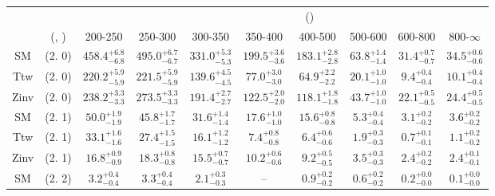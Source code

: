 \begin{table}[h!]
\tiny
\centering
{}
\begin{tabular}
{cccccccccc}
	\hline\hline
&	&	& \multicolumn{8}{c}{\scalht (\gev)}\\ 
	&	 (\njet, \nb) & 200-250 & 250-300 & 300-350 & 350-400 & 400-500 & 500-600 & 600-800 & 800-$\infty$ \\ [0.8ex] 
\hline
	SM & (2. 0) & $458.4^{+ 6.8 }_{- 6.8 }$ & $495.0^{+ 6.7 }_{- 6.7 }$ & $331.0^{+ 5.3 }_{- 5.3 }$ & $199.5^{+ 3.6 }_{- 3.6 }$ & $183.1^{+ 2.8 }_{- 2.8 }$ & $63.8^{+ 1.4 }_{- 1.4 }$ & $31.4^{+ 0.7 }_{- 0.7 }$ & $34.5^{+ 0.6 }_{- 0.6 }$ \\[0.5ex] 
	Ttw & (2. 0) & $220.2^{+ 5.9 }_{- 5.9 }$ & $221.5^{+ 5.9 }_{- 5.9 }$ & $139.6^{+ 4.5 }_{- 4.5 }$ & $77.0^{+ 3.0 }_{- 3.0 }$ & $64.9^{+ 2.2 }_{- 2.2 }$ & $20.1^{+ 1.0 }_{- 1.0 }$ & $9.4^{+ 0.4 }_{- 0.4 }$ & $10.1^{+ 0.4 }_{- 0.4 }$ \\[0.5ex] 
	Zinv & (2. 0) & $238.2^{+ 3.3 }_{- 3.3 }$ & $273.5^{+ 3.3 }_{- 3.3 }$ & $191.4^{+ 2.7 }_{- 2.7 }$ & $122.5^{+ 2.0 }_{- 2.0 }$ & $118.1^{+ 1.8 }_{- 1.8 }$ & $43.7^{+ 1.0 }_{- 1.0 }$ & $22.1^{+ 0.5 }_{- 0.5 }$ & $24.4^{+ 0.5 }_{- 0.5 }$ \\[0.5ex] 
	SM & (2. 1) & $50.0^{+ 1.9 }_{- 1.9 }$ & $45.8^{+ 1.7 }_{- 1.7 }$ & $31.6^{+ 1.4 }_{- 1.4 }$ & $17.6^{+ 1.0 }_{- 1.0 }$ & $15.6^{+ 0.8 }_{- 0.8 }$ & $5.3^{+ 0.4 }_{- 0.4 }$ & $3.1^{+ 0.2 }_{- 0.2 }$ & $3.6^{+ 0.2 }_{- 0.2 }$ \\[0.5ex] 
	Ttw & (2. 1) & $33.1^{+ 1.6 }_{- 1.6 }$ & $27.4^{+ 1.5 }_{- 1.5 }$ & $16.1^{+ 1.2 }_{- 1.2 }$ & $7.4^{+ 0.8 }_{- 0.8 }$ & $6.4^{+ 0.6 }_{- 0.6 }$ & $1.9^{+ 0.3 }_{- 0.3 }$ & $0.7^{+ 0.1 }_{- 0.1 }$ & $1.1^{+ 0.2 }_{- 0.2 }$ \\[0.5ex] 
	Zinv & (2. 1) & $16.8^{+ 0.9 }_{- 0.9 }$ & $18.3^{+ 0.8 }_{- 0.8 }$ & $15.5^{+ 0.7 }_{- 0.7 }$ & $10.2^{+ 0.6 }_{- 0.6 }$ & $9.2^{+ 0.5 }_{- 0.5 }$ & $3.5^{+ 0.3 }_{- 0.3 }$ & $2.4^{+ 0.2 }_{- 0.2 }$ & $2.4^{+ 0.1 }_{- 0.1 }$ \\[0.5ex] 
	SM & (2. 2) & $3.2^{+ 0.4 }_{- 0.4 }$ & $3.3^{+ 0.4 }_{- 0.4 }$ & $2.1^{+ 0.3 }_{- 0.3 }$ & -- & $0.9^{+ 0.2 }_{- 0.2 }$ & $0.6^{+ 0.2 }_{- 0.2 }$ & $0.2^{+ 0.0 }_{- 0.0 }$ & $0.1^{+ 0.0 }_{- 0.0 }$ \\[0.5ex] 

\end{tabular}
\end{table}

